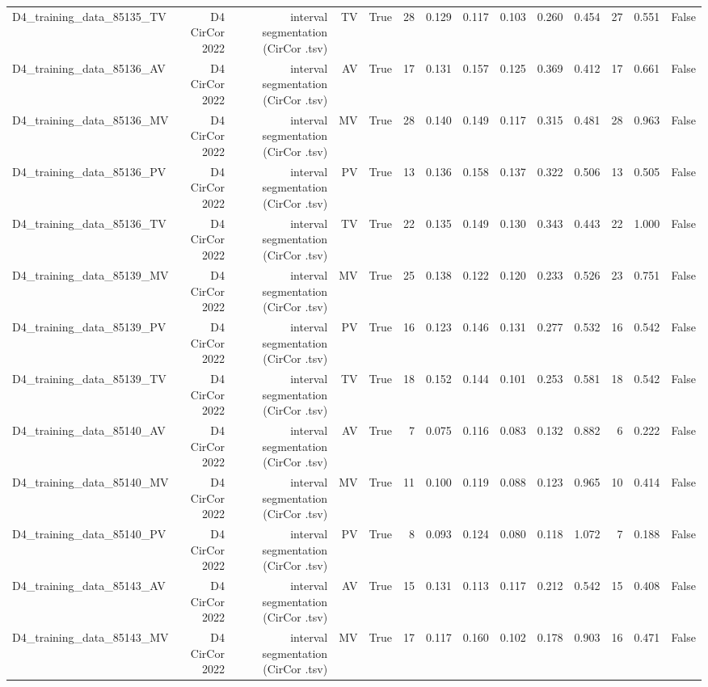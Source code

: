 \begin{table}[htbp]
\begin{tabular}{lrrrrrrrrrrrrr}
    D4\_training\_data\_85135\_TV & D4 CirCor 2022 & interval segmentation (CirCor .tsv) & TV & True & 28 & 0.129 & 0.117 & 0.103 & 0.260 & 0.454 & 27 & 0.551 & False \\
    D4\_training\_data\_85136\_AV & D4 CirCor 2022 & interval segmentation (CirCor .tsv) & AV & True & 17 & 0.131 & 0.157 & 0.125 & 0.369 & 0.412 & 17 & 0.661 & False \\
    D4\_training\_data\_85136\_MV & D4 CirCor 2022 & interval segmentation (CirCor .tsv) & MV & True & 28 & 0.140 & 0.149 & 0.117 & 0.315 & 0.481 & 28 & 0.963 & False \\
    D4\_training\_data\_85136\_PV & D4 CirCor 2022 & interval segmentation (CirCor .tsv) & PV & True & 13 & 0.136 & 0.158 & 0.137 & 0.322 & 0.506 & 13 & 0.505 & False \\
    D4\_training\_data\_85136\_TV & D4 CirCor 2022 & interval segmentation (CirCor .tsv) & TV & True & 22 & 0.135 & 0.149 & 0.130 & 0.343 & 0.443 & 22 & 1.000 & False \\
    D4\_training\_data\_85139\_MV & D4 CirCor 2022 & interval segmentation (CirCor .tsv) & MV & True & 25 & 0.138 & 0.122 & 0.120 & 0.233 & 0.526 & 23 & 0.751 & False \\
    D4\_training\_data\_85139\_PV & D4 CirCor 2022 & interval segmentation (CirCor .tsv) & PV & True & 16 & 0.123 & 0.146 & 0.131 & 0.277 & 0.532 & 16 & 0.542 & False \\
    D4\_training\_data\_85139\_TV & D4 CirCor 2022 & interval segmentation (CirCor .tsv) & TV & True & 18 & 0.152 & 0.144 & 0.101 & 0.253 & 0.581 & 18 & 0.542 & False \\
    D4\_training\_data\_85140\_AV & D4 CirCor 2022 & interval segmentation (CirCor .tsv) & AV & True & 7 & 0.075 & 0.116 & 0.083 & 0.132 & 0.882 & 6 & 0.222 & False \\
    D4\_training\_data\_85140\_MV & D4 CirCor 2022 & interval segmentation (CirCor .tsv) & MV & True & 11 & 0.100 & 0.119 & 0.088 & 0.123 & 0.965 & 10 & 0.414 & False \\
    D4\_training\_data\_85140\_PV & D4 CirCor 2022 & interval segmentation (CirCor .tsv) & PV & True & 8 & 0.093 & 0.124 & 0.080 & 0.118 & 1.072 & 7 & 0.188 & False \\
    D4\_training\_data\_85143\_AV & D4 CirCor 2022 & interval segmentation (CirCor .tsv) & AV & True & 15 & 0.131 & 0.113 & 0.117 & 0.212 & 0.542 & 15 & 0.408 & False \\
    D4\_training\_data\_85143\_MV & D4 CirCor 2022 & interval segmentation (CirCor .tsv) & MV & True & 17 & 0.117 & 0.160 & 0.102 & 0.178 & 0.903 & 16 & 0.471 & False \\

\end{tabular}
\end{table}
